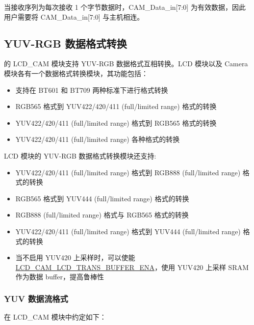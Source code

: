 \documentclass[main\_\_CN.tex]{subfiles}
\begin{document}
\begin{tiplisting}
当接收序列为每次接收 1 个字节数据时，CAM\_Data\_in[7:0] 为有效数据，因此用户需要将 CAM\_Data\_in[7:0] 与主机相连。
\end{tiplisting}

\subsection{YUV-RGB 数据格式转换}
\label{sec:yuvrgb_config}
\chipname{} 的 LCD\_CAM 模块支持 YUV-RGB 数据格式互相转换。LCD 模块以及 Camera 模块各有一个数据格式转换模块，其功能包括：
\begin{itemize}
    \item 支持在 BT601 和 BT709 两种标准下进行格式转换
    \item RGB565 格式到 YUV422/420/411 (full/limited range) 格式的转换
    \item YUV422/420/411 (full/limited range) 格式到 RGB565 格式的转换
    \item YUV422/420/411 (full/limited range) 各种格式的转换
\end{itemize}

    LCD 模块的 YUV-RGB 数据格式转换模块还支持:
    \begin{itemize}
        \item YUV422/420/411 (full/limited range) 格式到 RGB888 (full/limited range) 格式的转换
        \item RGB565  格式到 YUV444 (full/limited range) 格式的转换
        \item RGB888 (full/limited range) 格式与 RGB565 格式的转换
        \item YUV422/420/411 (full/limited range) 格式到 YUV444 (full/limited range) 格式的转换
        \item 当不启用 YUV420 上采样时，可以使能 \hyperref[fielddesc:LCDCAMLCDTRANSBUFFERENA]{LCD\_CAM\_LCD\_TRANS\_BUFFER\_ENA}，使用 YUV420 上采样 SRAM 作为数据 buffer，提高鲁棒性
    \end{itemize}

\subsubsection{YUV 数据流格式}
在 \chipname{} LCD\_CAM 模块中约定如下：
\end{document}
